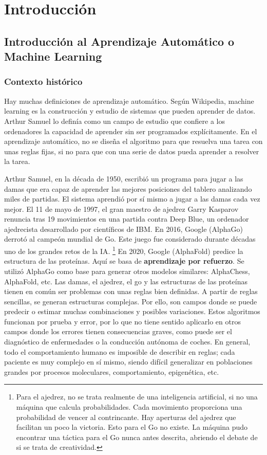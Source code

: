 \chapter{Introducción}
\section{Introducción al Aprendizaje Automático o Machine Learning}
\subsection{Contexto histórico}
Hay muchas definiciones de aprendizaje automático. Según Wikipedia, machine learning es la construcción y estudio de sistemas que pueden aprender de datos. Arthur Samuel lo definía como un campo de estudio que confiere a los ordenadores la capacidad de aprender sin ser programados explícitamente. En el aprendizaje automático, no se diseña el algoritmo para que resuelva una tarea con unas reglas fijas, si no para que con una serie de datos pueda aprender a resolver la tarea. 

Arthur Samuel, en la década de 1950, escribió un programa para jugar a las damas que era capaz de aprender las mejores posiciones del tablero analizando miles de partidas. El sistema aprendió por sí mismo a jugar a las damas cada vez mejor. El 11 de mayo de 1997, el gran maestro de ajedrez Garry Kasparov renuncia tras 19 movimientos en una partida contra Deep Blue, un ordenador ajedrecista desarrollado por científicos de IBM. En 2016, Google (AlphaGo) derrotó al campeón mundial de Go. Este juego fue considerado durante décadas uno de los grandes retos de la IA. \footnote{Para el ajedrez, no se trata realmente de una inteligencia artificial, si no una máquina que calcula probabilidades. Cada movimiento proporciona una probabilidad de vencer al contrincante. Hay aperturas del ajedrez que facilitan un poco la victoria. Esto para el Go no existe. La máquina pudo encontrar una táctica para el Go nunca antes descrita, abriendo el debate de si se trata de creatividad.} En 2020, Google (AlphaFold) predice la estructura de las proteínas. Aquí se basa de \textbf{aprendizaje por refuerzo}. Se utilizó AlphaGo como base para generar otros modelos similares: AlphaChess, AlphaFold, etc. Las damas, el ajedrez, el go y las estructuras de las proteínas tienen en común ser problemas con unas reglas bien definidas. A partir de reglas sencillas, se generan estructuras complejas. Por ello, son campos donde se puede predecir o estimar muchas combinaciones y posibles variaciones. Estos algoritmos funcionan por prueba y error, por lo que no tiene sentido aplicarlo en otros campos donde los errores tienen consecuencias graves, como puede ser el diagnóstico de enfermedades o la conducción autónoma de coches. En general, todo el comportamiento humano es imposible de describir en reglas; cada paciente es muy complejo en sí mismo, siendo difícil generalizar en poblaciones grandes por procesos moleculares, comportamiento, epigenética, etc. 

